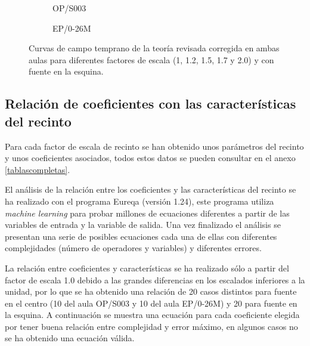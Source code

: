 \begin{figure}[ht]
    \begin{subfigure}[b]{0.4\textwidth}
    	\centering%
         {%
    }
    \caption{OP/S003}%
    \end{subfigure}%
    \hspace{1.65cm}%
    \begin{subfigure}[b]{0.4\textwidth}%
    	\centering%
        {%
    }
    \caption{EP/0-26M}%
    \end{subfigure}
    \caption{Curvas de campo temprano de la teoría revisada corregida en ambas aulas para diferentes factores de escala (1, 1.2, 1.5, 1.7 y 2.0) y con fuente en la esquina.}
\label{graf:campotempranofactoresesquina}%
\end{figure}
\FloatBarrier 


\subsection{Relación de coeficientes con las características del recinto}
\label{relacioncoef}

Para cada factor de escala de recinto se han obtenido unos parámetros del recinto y unos coeficientes asociados, todos estos datos se pueden consultar en el anexo \ref{tablascompletas}. 

El análisis de la relación entre los coeficientes y las características del recinto se ha realizado con el programa Eureqa (versión 1.24), este programa utiliza \textit{machine learning} para probar millones de ecuaciones diferentes a partir de las variables de entrada y la variable de salida. Una vez finalizado el análisis se presentan una serie de posibles ecuaciones cada una de ellas con diferentes complejidades (número de operadores y variables) y diferentes errores.

La relación entre coeficientes y características se ha realizado sólo a partir del factor de escala 1.0 debido a las grandes diferencias en los escalados inferiores a la unidad, por lo que se ha obtenido una relación de 20 casos distintos para fuente en el centro (10 del aula  OP/S003 y 10 del aula EP/0-26M) y 20 para fuente en la esquina. A continuación se muestra una ecuación para cada coeficiente elegida por tener buena relación entre complejidad y error máximo, en algunos casos no se ha obtenido una ecuación válida.

